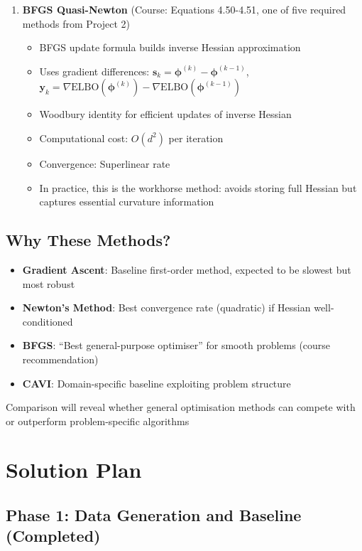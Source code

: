 \documentclass[11pt]{article}
\newcommand{\ELBO}{\text{ELBO}}
\begin{document}
\begin{enumerate}[leftmargin=*]
\item \textbf{BFGS Quasi-Newton} (Course: Equations 4.50-4.51, one of five required methods from Project 2)
\begin{itemize}
\item BFGS update formula builds inverse Hessian approximation
\item Uses gradient differences: $\bm{s}_k = \bm{\phi}^{(k)} - \bm{\phi}^{(k-1)}$, $\bm{y}_k = \nabla \ELBO(\bm{\phi}^{(k)}) - \nabla \ELBO(\bm{\phi}^{(k-1)})$
\item Woodbury identity for efficient updates of inverse Hessian
\item Computational cost: $O(d^2)$ per iteration
\item Convergence: Superlinear rate
\item In practice, this is the workhorse method: avoids storing full Hessian but captures essential curvature information
\end{itemize}
\end{enumerate}

\subsection{Why These Methods?}

\begin{itemize}
\item \textbf{Gradient Ascent}: Baseline first-order method, expected to be slowest but most robust
\item \textbf{Newton's Method}: Best convergence rate (quadratic) if Hessian well-conditioned
\item \textbf{BFGS}: ``Best general-purpose optimiser'' for smooth problems (course recommendation)
\item \textbf{CAVI}: Domain-specific baseline exploiting problem structure
\end{itemize}

Comparison will reveal whether general optimisation methods can compete with or outperform problem-specific algorithms

\section{Solution Plan}

\subsection{Phase 1: Data Generation and Baseline (Completed)}
\end{document}
